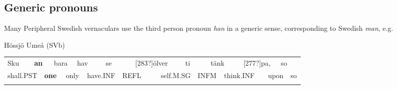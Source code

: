 \subsection{\rmfamily Generic pronouns}

\begin{styleBodyTextFirst}
Many Peripheral Swedish vernaculars use the third person pronoun \textit{han} in a generic sense, corresponding to Swedish \textit{man}, e.g.

\end{styleBodyTextFirst}

\begin{listWWNumileveli}
\item 

\begin{styleExample}
Hössjö Umeå (SVb)

\end{styleExample}

\end{listWWNumileveli}

\begin{tabular}{llllllllllllllllllll}
\lsptoprule
Sku & \multicolumn{2}{l}{{\bfseries an}

} & \multicolumn{2}{l}{bara

} & \multicolumn{2}{l}{hav

} & \multicolumn{2}{l}{se

} & \multicolumn{2}{l}{[283?]ölver

} & \multicolumn{2}{l}{ti

} & \multicolumn{2}{l}{tänk

} & \multicolumn{2}{l}{[277?]pa,

} & \multicolumn{2}{l}{so

} & \\
\multicolumn{2}{l}{shall.PST

} & \multicolumn{2}{l}{{\bfseries one}

} & \multicolumn{2}{l}{only

} & \multicolumn{2}{l}{have.INF

} & \multicolumn{2}{l}{REFL

} & \multicolumn{2}{l}{self.M.SG

} & \multicolumn{2}{l}{INFM

} & \multicolumn{2}{l}{think.INF

} & \multicolumn{2}{l}{upon

} & \multicolumn{2}{l}{so

}\\
\lspbottomrule
\end{tabular}

